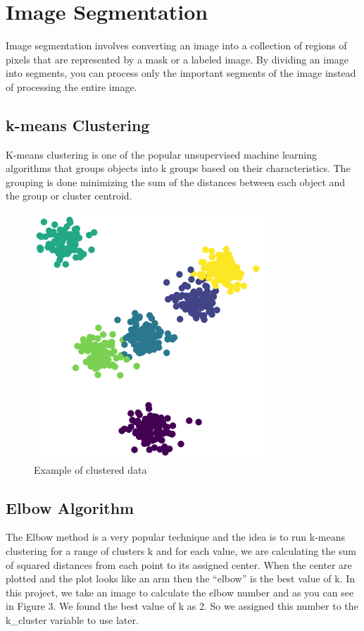 \documentclass[onecolumn]{article}
\begin{document}
\section{Image Segmentation}
Image segmentation involves converting an image into a collection of regions of pixels that are represented by a mask or a labeled image.
By dividing an image into segments, you can process only the important segments of the image instead of processing the entire image. 

\subsection{k-means Clustering} %
K-means clustering is one of the popular unsupervised machine learning algorithms that groups objects into k groups based on their characteristics. The grouping is done minimizing the sum of the distances between each object and the group or cluster centroid.

\begin{figure}[H]
\centering
  \includegraphics[scale=0.7]{images/cluster.png}
  \caption{Example of clustered data}
  \label{fig:4}
\end{figure}

\subsection{Elbow Algorithm} %
The Elbow method is a very popular technique and the idea is to run k-means clustering for a range of clusters k and for each value, we are calculating the sum of squared distances from each point to its assigned center. When the center are plotted and the plot looks like an arm then the “elbow” is the best value of k. In this project, we take an image to calculate the elbow number and as you can see in Figure 3. We found the best value of k as 2. So we assigned this number to the k\_cluster variable to use later.
\end{document}
